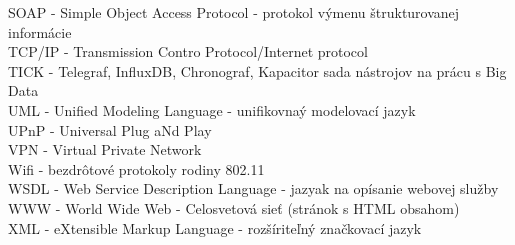 SOAP - Simple Object Access Protocol - protokol výmenu štrukturovanej informácie \\
TCP/IP - Transmission Contro Protocol/Internet protocol \\ 
TICK - Telegraf, InfluxDB, Chronograf, Kapacitor sada nástrojov na prácu s Big Data\\
UML - Unified Modeling Language - unifikovnaý modelovací jazyk \\
UPnP - Universal Plug aNd Play \\
VPN - Virtual Private Network \\
Wifi - bezdrôtové protokoly rodiny 802.11 \\
WSDL - Web Service Description Language - jazyak na opísanie webovej služby \\
WWW - World Wide Web - Celosvetová sieť (stránok s HTML obsahom) \\
XML - eXtensible Markup Language - rozšíriteľný značkovací jazyk
